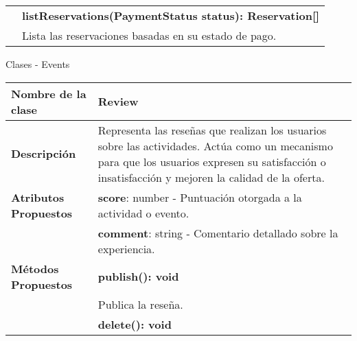 \begin{clases}
\begin{tabular}{|>{\raggedright\arraybackslash}p{4cm}|p{12cm}|}
		                              & \textbf{listReservations(PaymentStatus status): Reservation[]}                                                                                                                              \\
		                              & Lista las reservaciones basadas en su estado de pago.                                                                                                                                       \\

		\hline
	\end{tabular}
	\caption{Clases - Events}
\end{clases}

\begin{clases}
	\centering
\begin{tabular}{|>{\raggedright\arraybackslash}p{4cm}|p{12cm}|}
		\hline
		\textbf{Nombre de la clase}   & \textbf{Review}                                                                                                                                                                                    \\
		\hline
		\textbf{Descripción}          & Representa las reseñas que realizan los usuarios sobre las actividades. Actúa como un mecanismo para que los usuarios expresen su satisfacción o insatisfacción y mejoren la calidad de la oferta. \\
		\hline
		\textbf{Atributos Propuestos} & \textbf{score}: number - Puntuación otorgada a la actividad o evento.                                                                                                                              \\
		                              & \textbf{comment}: string - Comentario detallado sobre la experiencia.                                                                                                                              \\
		\hline
		\textbf{Métodos Propuestos}   & \textbf{publish(): void}                                                                                                                                                                           \\
		                              & Publica la reseña.                                                                                                                                                                                 \\
		                              & \textbf{delete(): void}                                                                                                                                                                            \\

\end{tabular}
\end{clases}
